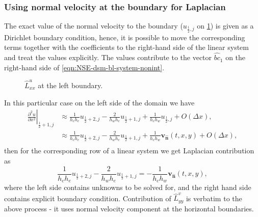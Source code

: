 \documentclass{article}
\numberwithin{equation}{section}
\begin{document}
\subsubsection{Using normal velocity at the boundary for Laplacian}\label{subsubsec:normal-bc}
The exact value  of the normal velocity to the boundary ($u_{\frac{1}{2},j}$ on \cref{fig:luxx-left}) is given as a Dirichlet boundary condition, hence, it is possible to move the corresponding terms together with the coefficients to the right-hand side of the linear system and treat the values explicitly. The values contribute to the vector $\hat{bc}_1$ on the right-hand side of \cref{eqn:NSE-dsm-bl-system-nonint}.
\begin{figure}[H] %
  \caption{$\hat{L}^u_{xx}$ at the left boundary.}\label{fig:luxx-left}
\end{figure}
In this particular case on the left side of the domain we have
\begin{align}\label{eqn:laplacian-discretization-non-uniform-dx-bc}
\left.\frac{\partial^2 u}{\partial x^2}\right|_{\frac{1}{2}+1,j} 
& \approx \frac{1}{h_c h_e}u_{\frac{1}{2}+2,j} - \frac{2}{h_w h_e}u_{\frac{1}{2}+1,j} + \frac{1}{h_c h_w}u_{\frac{1}{2},j} + O(\Delta x),\\
& \approx \frac{1}{h_c h_e}u_{\frac{1}{2}+2,j} - \frac{2}{h_w h_e}u_{\frac{1}{2}+1,j} + \frac{1}{h_c h_w}\boldsymbol{v}_\mathbf{\hat{n}}(t,x,y) + O(\Delta x),\\
\end{align}
then for the corresponding row of a linear system we get Laplacian contribution as
\begin{equation}
	\frac{1}{h_c h_e}u_{\frac{1}{2}+2,j} - \frac{2}{h_w h_e}u_{\frac{1}{2}+1,j} =- \frac{1}{h_c h_w}\boldsymbol{v}_\mathbf{\hat{n}}(t,x,y),
\end{equation}
where the left side contains unknowns to be solved for, and the right hand side contains explicit boundary condition. Contribution of $\hat{L}^v_{yy}$ is verbatim to the above process - it uses normal velocity component at the horizontal boundaries. 
\end{document}
